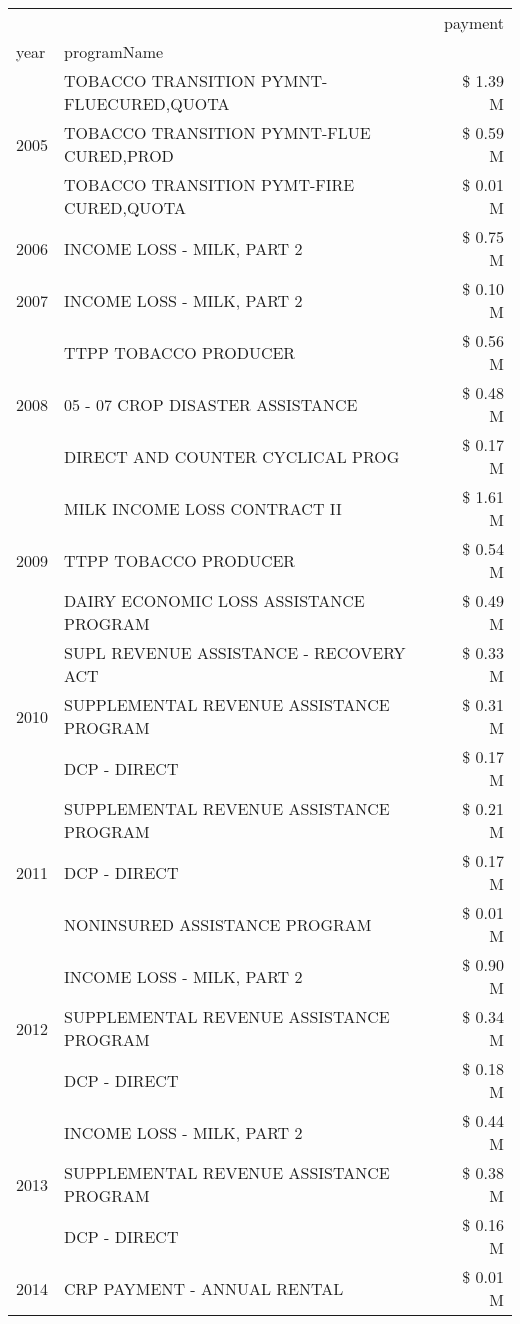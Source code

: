 \begin{tabular}{llr}
\toprule
 &  & payment \\
year & programName &  \\
\midrule
\multirow[t]{3}{*}{2005} & TOBACCO TRANSITION PYMNT-FLUECURED,QUOTA & \$ 1.39 M \\
 & TOBACCO TRANSITION PYMNT-FLUE CURED,PROD & \$ 0.59 M \\
 & TOBACCO TRANSITION PYMT-FIRE CURED,QUOTA & \$ 0.01 M \\
\cline{1-3}
2006 & INCOME LOSS - MILK, PART 2 & \$ 0.75 M \\
\cline{1-3}
2007 & INCOME LOSS - MILK, PART 2 & \$ 0.10 M \\
\cline{1-3}
\multirow[t]{3}{*}{2008} & TTPP TOBACCO PRODUCER & \$ 0.56 M \\
 & 05 - 07 CROP DISASTER ASSISTANCE & \$ 0.48 M \\
 & DIRECT AND COUNTER CYCLICAL PROG & \$ 0.17 M \\
\cline{1-3}
\multirow[t]{3}{*}{2009} & MILK INCOME LOSS CONTRACT II & \$ 1.61 M \\
 & TTPP TOBACCO PRODUCER & \$ 0.54 M \\
 & DAIRY ECONOMIC LOSS ASSISTANCE PROGRAM & \$ 0.49 M \\
\cline{1-3}
\multirow[t]{3}{*}{2010} & SUPL REVENUE ASSISTANCE - RECOVERY ACT & \$ 0.33 M \\
 & SUPPLEMENTAL REVENUE ASSISTANCE PROGRAM & \$ 0.31 M \\
 & DCP - DIRECT & \$ 0.17 M \\
\cline{1-3}
\multirow[t]{3}{*}{2011} & SUPPLEMENTAL REVENUE ASSISTANCE PROGRAM & \$ 0.21 M \\
 & DCP - DIRECT & \$ 0.17 M \\
 & NONINSURED ASSISTANCE PROGRAM & \$ 0.01 M \\
\cline{1-3}
\multirow[t]{3}{*}{2012} & INCOME LOSS - MILK, PART 2 & \$ 0.90 M \\
 & SUPPLEMENTAL REVENUE ASSISTANCE PROGRAM & \$ 0.34 M \\
 & DCP - DIRECT & \$ 0.18 M \\
\cline{1-3}
\multirow[t]{3}{*}{2013} & INCOME LOSS - MILK, PART 2 & \$ 0.44 M \\
 & SUPPLEMENTAL REVENUE ASSISTANCE PROGRAM & \$ 0.38 M \\
 & DCP - DIRECT & \$ 0.16 M \\
\cline{1-3}
\multirow[t]{2}{*}{2014} & CRP PAYMENT - ANNUAL RENTAL & \$ 0.01 M \\

\end{tabular}
